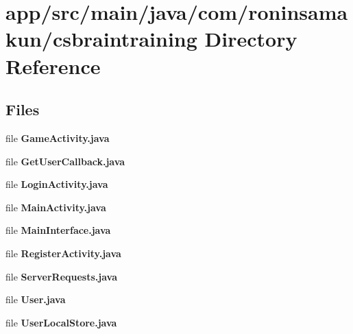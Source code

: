 \section{app/src/main/java/com/roninsamakun/csbraintraining Directory Reference}
\label{dir_dae52d2963b410597c6a12cc53134b72}
\subsection*{Files}
\begin{DoxyCompactItemize}
\item 
file {\bfseries Game\+Activity.\+java}
\item 
file {\bfseries Get\+User\+Callback.\+java}
\item 
file {\bfseries Login\+Activity.\+java}
\item 
file {\bfseries Main\+Activity.\+java}
\item 
file {\bfseries Main\+Interface.\+java}
\item 
file {\bfseries Register\+Activity.\+java}
\item 
file {\bfseries Server\+Requests.\+java}
\item 
file {\bfseries User.\+java}
\item 
file {\bfseries User\+Local\+Store.\+java}
\end{DoxyCompactItemize}
